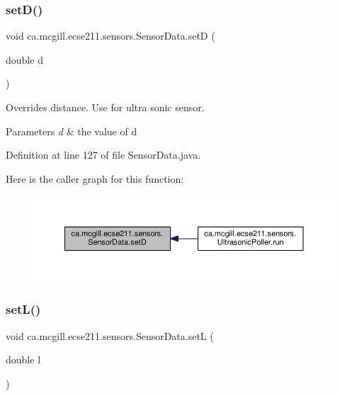 \subsubsection{\texorpdfstring{set\+D()}{setD()}}
{\footnotesize\ttfamily void ca.\+mcgill.\+ecse211.\+sensors.\+Sensor\+Data.\+setD (\begin{DoxyParamCaption}\item[{double}]{d }\end{DoxyParamCaption})}

Overrides distance. Use for ultra sonic sensor.


\begin{DoxyParams}{Parameters}
{\em d} & the value of d \\
\hline
\end{DoxyParams}


Definition at line 127 of file Sensor\+Data.\+java.

Here is the caller graph for this function\+:
\nopagebreak
\begin{figure}[H]
\begin{center}
\leavevmode
\includegraphics[width=350pt]{classca_1_1mcgill_1_1ecse211_1_1sensors_1_1_sensor_data_ae20bf127c57dcfcb3b7632ca05b6d482_icgraph}
\end{center}
\end{figure}
\mbox{\label{classca_1_1mcgill_1_1ecse211_1_1sensors_1_1_sensor_data_aeafd49ce71819e8e1a5d5ff6287e7819}} 
\subsubsection{\texorpdfstring{set\+L()}{setL()}}
{\footnotesize\ttfamily void ca.\+mcgill.\+ecse211.\+sensors.\+Sensor\+Data.\+setL (\begin{DoxyParamCaption}\item[{double}]{l }\end{DoxyParamCaption})}

